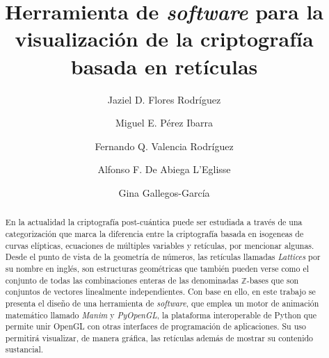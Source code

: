 \documentclass{llncs}
\begin{document}
\renewcommand{\listtablename}{Índice de tablas}
\renewcommand{\tablename}{Tabla} 

\title{Herramienta de \textit{software} para la visualizaci\'on de la criptografía basada en ret\'iculas}

\author{Jaziel D. Flores Rodr\'iguez \and
Miguel E. P\'erez Ibarra \and
Fernando Q. Valencia Rodr\'iguez \and
Alfonso F. De Abiega L'Eglisse \and
Gina Gallegos-Garc\'ia}


\maketitle

\begin{abstract}
En la actualidad la criptograf\'ia post-cu\'antica puede ser estudiada a trav\'es de una categorizaci\'on que marca la diferencia entre la criptograf\'ia basada en isogeneas de curvas el\'ipticas, ecuaciones de m\'ultiples variables y ret\'iculas, por mencionar algunas. Desde el punto de vista de la geometr\'ia de n\'umeros, las ret\'iculas llamadas  \textit{Lattices} por su nombre en ingl\'es, son estructuras geom\'etricas que tambi\'en pueden verse como el conjunto de todas las combinaciones enteras de las denominadas $\mathbb{Z}$-bases que son conjuntos de vectores linealmente independientes. Con base en ello, en este trabajo se presenta el diseño de una herramienta de \textit{software}, que emplea un motor de animaci\'on matem\'atico llamado \textit{Manim} y \textit{PyOpenGL}, la plataforma interoperable de Python que permite unir OpenGL con otras interfaces de programación de aplicaciones. Su uso permitir\'a visualizar, de manera gr\'afica, las retículas además de mostrar su contenido sustancial.   

\end{abstract}
\end{document}
